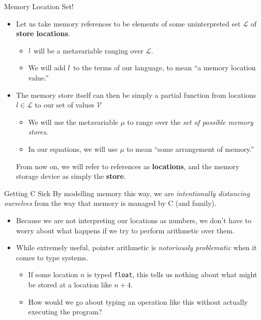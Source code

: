 \documentclass[11pt]{beamer}
\begin{document}
\begin{frame}[fragile=singleslide]{Memory Location Set!}

\begin{itemize}
\item Let us take memory references to be elements of some uninterpreted set $\mathcal{L}$ of \textbf{store locations}.
\begin{itemize}
\item $\mathnormal{l}$ will be a metavariable ranging over $\mathcal{L}$.
\item We will add $\mathnormal{l}$ to the terms of our language, to mean ``a memory location value.''
\end{itemize}
\item The memory store itself can then be simply a partial function from locations $l \in \mathcal{L}$ to our set of values $\mathcal{V}$
\begin{itemize}
\item We will use the metavariable $\mu$ to range over the \emph{set of possible memory stores}.
\item In our equations, we will use $\mu$ to mean ``some arrangement of memory.''
\end{itemize}
From now on, we will refer to references as \textbf{locations}, and the memory storage device as simply the \textbf{store}.
\end{itemize}
\end{frame}



\begin{frame}[fragile=singleslide]{Getting C Sick}
By modelling memory this way, we are \emph{intentionally distancing ourselves} from the way that memory is managed by C (and family).
\begin{itemize}
\item Because we are not interpreting our locations as numbers, we don't have to worry about what happens if we try to perform arithmetic over them.
\item While extremely useful, pointer arithmetic is \emph{notoriously problematic} when it comes to type systems.  
\begin{itemize}
\item If some location $n$ is typed \texttt{float}, this tells us nothing about what might be stored at a location like $n+4$.
\item How would we go about typing an operation like this without actually executing the program?
\end{itemize}
\end{itemize}
\end{frame}
\end{document}
